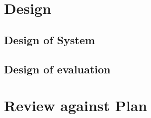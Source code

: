 \documentclass[11pt,times,oneside,openright,hardcopy]{eeereport}
\begin{document}
\chapter{Design}\label{cpt:des}
\section{Design of System}
\section{Design of evaluation}

\chapter{Review against Plan}




\end{document}
